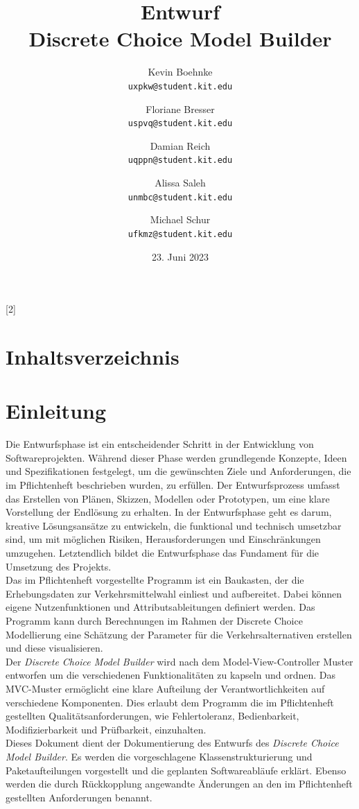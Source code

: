 \documentclass{article}
\title{Entwurf \\ \large Discrete Choice Model Builder}
\author{Kevin Boehnke \\ \texttt{uxpkw@student.kit.edu}
\and Floriane Bresser \\ \texttt{uspvq@student.kit.edu}
\and Damian Reich \\ \texttt{uqppn@student.kit.edu}
\and Alissa Saleh \\ \texttt{unmbc@student.kit.edu}
\and Michael Schur \\ \texttt{ufkmz@student.kit.edu}}
\date{23. Juni 2023}
\begin{document}
\maketitle
\newpage
\startcontents[maintableofcontents]
[2]{\section*{Inhaltsverzeichnis}}
\thispagestyle{empty}
\newpage
{}

\section{Einleitung}
Die Entwurfsphase ist ein entscheidender Schritt in der Entwicklung von Softwareprojekten. Während dieser Phase werden grundlegende Konzepte, Ideen und Spezifikationen festgelegt, um die gewünschten Ziele und Anforderungen, die im Pflichtenheft beschrieben wurden, zu erfüllen. Der Entwurfsprozess umfasst das Erstellen von Plänen, Skizzen, Modellen oder Prototypen, um eine klare Vorstellung der Endlösung zu erhalten.
In der Entwurfsphase geht es darum, kreative Lösungsansätze zu entwickeln, die funktional und technisch umsetzbar sind, um mit möglichen Risiken, Herausforderungen und Einschränkungen umzugehen.
Letztendlich bildet die Entwurfsphase das Fundament für die Umsetzung des Projekts.\\

Das im Pflichtenheft vorgestellte Programm ist ein Baukasten, der die Erhebungsdaten zur Verkehrsmittelwahl einliest und aufbereitet. Dabei können eigene Nutzenfunktionen und Attributsableitungen definiert werden. Das Programm kann durch Berechnungen im Rahmen der Discrete Choice Modellierung eine Schätzung der Parameter für die Verkehrsalternativen erstellen und diese visualisieren.\\

Der \emph{Discrete Choice Model Builder} wird nach dem Model-View-Controller Muster entworfen um die verschiedenen Funktionalitäten zu kapseln und ordnen.
Das MVC-Muster ermöglicht eine klare Aufteilung der Verantwortlichkeiten auf verschiedene Komponenten.
Dies erlaubt dem Programm die im Pflichtenheft gestellten Qualitätsanforderungen, wie Fehlertoleranz, Bedienbarkeit, Modifizierbarkeit und Prüfbarkeit, einzuhalten.\\

Dieses Dokument dient der Dokumentierung des Entwurfs des \emph{Discrete Choice Model Builder}. Es werden die vorgeschlagene Klassenstrukturierung und Paketaufteilungen vorgestellt und die geplanten Softwareabläufe erklärt. Ebenso werden die durch Rückkopplung angewandte Änderungen an den im Pflichtenheft gestellten Anforderungen benannt.
\end{document}
